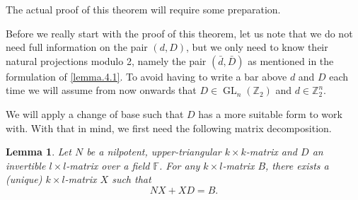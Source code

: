 \documentclass[a4paper]{article}
\theoremstyle{plain}
\newtheorem{lemma}[theorem]{Lemma}
\theoremstyle{definition}
\theoremstyle{remark}
\DeclareMathOperator{\GL}{GL}
\newcommand{\ZZ}{{\mathbb{Z}}}
\newcommand{\FF}{{\mathbb{F}}}
\begin{document}
The actual proof of this theorem will require some preparation. 

\medskip

Before we really start with the  proof of this theorem, let us note that we do not need full information on the pair $(d,D)$, but we only need to know their natural projections modulo 2, namely the pair $(\bar{d}, \bar{D})$ as mentioned in the formulation of \cref{lemma.4.1}. To avoid having to write a bar above $d$ and $D$ each time we will assume from now onwards that $D\in \GL_n(\ZZ_2)$ and $d\in \ZZ_2^n$.

\medskip

We will apply a change of base such that \(D\) has a more suitable form to work with. With that in mind, we first need the following matrix decomposition.

\begin{lemma}
	\label{lem:NXXDB}
	Let \(N\) be a nilpotent, upper-triangular \(k \times k\)-matrix and \(D\) an invertible \(l \times l\)-matrix over a field \(\FF\). For any \(k \times l\)-matrix \(B\), there exists a (unique) \(k \times l\)-matrix \(X\) such that
	\begin{equation}
	\label{eq:NXXDB}
	NX + XD = B.
	\end{equation}
\end{lemma}
\end{document}
